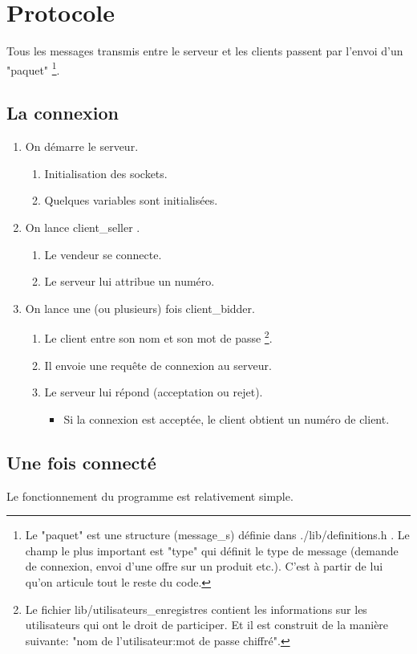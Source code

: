 \section{Protocole}
Tous les messages transmis entre le serveur et les clients passent par l'envoi d'un "paquet"
\protect\footnote{
	Le "paquet" est une structure (message\_s) définie dans ./lib/definitions.h . 
	Le champ le plus important est "type" qui définit le type de message 
	(demande de connexion, envoi d'une offre sur un produit etc.).
	C'est à partir de lui qu'on articule tout le reste du code.
}.

\subsection{La connexion}
\begin{enumerate}
\item On démarre le serveur.
	\begin{enumerate}
	\item Initialisation des sockets.
	\item Quelques variables sont initialisées.
	\end{enumerate}
\item On lance client\_seller .
	\begin{enumerate}
	\item Le vendeur se connecte.
	\item Le serveur lui attribue un numéro.
	\end{enumerate}
\item On lance une (ou plusieurs) fois client\_bidder.
	\begin{enumerate}
	\item Le client entre son nom et son mot de passe
\protect\footnote{
Le fichier lib/utilisateurs\_enregistres contient les informations sur les utilisateurs qui ont le droit de participer.
Et il est construit de la manière suivante: "nom de l'utilisateur:mot de passe chiffré".
}.
	\item Il envoie une requête de connexion au serveur.
	\item Le serveur lui répond (acceptation ou rejet).
		\begin{itemize}
		\item Si la connexion est acceptée, le client obtient un numéro de client.
		\end{itemize}
	\end{enumerate}
\end{enumerate}

\subsection{Une fois connecté}
Le fonctionnement du programme est relativement simple.

